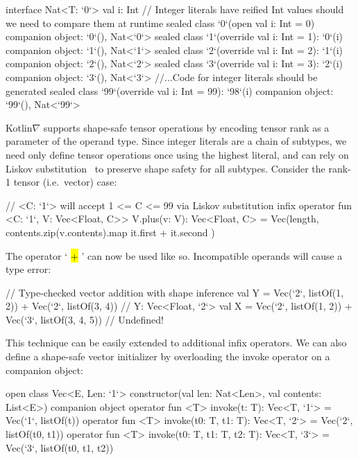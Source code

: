 \documentclass[12pt,initial,twoside,maitrise]{dms}
\newcommand{\inline}[1]{%
\begingroup%
\sethlcolor{slightgray}%
\hl{\ttfamily\small #1}%
\endgroup
}
\numberwithin{equation}{section}
\numberwithin{table}{chapter}
\numberwithin{figure}{chapter}
\begin{document}
%
\begin{kotlinlisting}[caption={Shape safe tensor addition for rank-1 tensors, $\forall C\leq2.$}]
interface Nat<T: `0`> { val i: Int }
// Integer literals have reified Int values should we need to compare them at runtime
sealed class `0`(open val i: Int = 0) { companion object: `0`(), Nat<`0`> }
sealed class `1`(override val i: Int = 1): `0`(i) { companion object: `1`(), Nat<`1`> }
sealed class `2`(override val i: Int = 2): `1`(i) { companion object: `2`(), Nat<`2`> }
sealed class `3`(override val i: Int = 3): `2`(i) { companion object: `3`(), Nat<`3`> }
//...Code for integer literals should be generated
sealed class `99`(override val i: Int = 99): `98`(i) { companion object: `99`(), Nat<`99`> }
\end{kotlinlisting}
%
Kotlin$\nabla$ supports shape-safe tensor operations by encoding tensor rank as a parameter of the operand type. Since integer literals are a chain of subtypes, we need only define tensor operations once using the highest literal, and can rely on Liskov substitution~\citep{liskov1987} to preserve shape safety for all subtypes. Consider the rank-1 tensor (i.e.\ vector) case:
%
\begin{kotlinlisting}
// <C: `1`> will accept 1 <= C <= 99 via Liskov substitution
infix operator fun <C: `1`, V: Vec<Float, C>> V.plus(v: V): Vec<Float, C> =
    Vec(length, contents.zip(v.contents).map { it.first + it.second })
\end{kotlinlisting}
%
The operator `\inline{+}' can now be used like so. Incompatible operands will cause a type error:
%
\begin{kotlinlisting}
// Type-checked vector addition with shape inference
val Y = Vec(`2`, listOf(1, 2)) + Vec(`2`, listOf(3, 4)) // Y: Vec<Float, `2`>
val X = Vec(`2`, listOf(1, 2)) + Vec(`3`, listOf(3, 4, 5)) // Undefined!
\end{kotlinlisting}
%
This technique can be easily extended to additional infix operators. We can also define a shape-safe vector initializer by overloading the invoke operator on a companion object:
%
\begin{kotlinlisting}
open class Vec<E, Len: `1`> constructor(val len: Nat<Len>, val contents: List<E>) {
  companion object {
    operator fun <T> invoke(t: T): Vec<T, `1`> = Vec(`1`, listOf(t))
    operator fun <T> invoke(t0: T, t1: T): Vec<T, `2`> = Vec(`2`, listOf(t0, t1))
    operator fun <T> invoke(t0: T, t1: T, t2: T): Vec<T, `3`> = Vec(`3`, listOf(t0, t1, t2))
  }
}
\end{kotlinlisting}
\end{document}
